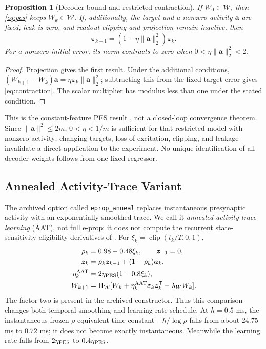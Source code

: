 \documentclass[letterpaper,10pt,conference]{IEEEtran}
\newcommand{\T}{^{\mathsf T}}
\newcommand{\clip}{\operatorname{clip}}
\newtheorem{proposition}{Proposition}
\begin{document}
\begin{proposition}[Decoder bound and restricted contraction]
\label{prop:pes}
If $W_0\in\mathcal W$, then \eqref{eq:pes} keeps $W_k\in\mathcal W$.
If, additionally, the target and a nonzero activity $\bm a$ are fixed,
leak is zero, and readout clipping and projection remain inactive, then
\begin{equation}
 \bm\varepsilon_{k+1}
       =(1-\eta\|\bm a\|_2^2)\bm\varepsilon_k.
 \label{eq:contraction}
\end{equation}
For a nonzero initial error, its norm contracts to zero when
$0<\eta\|\bm a\|_2^2<2$.
\end{proposition}
\begin{proof}
Projection gives the first result. Under the additional conditions,
$(W_{k+1}-W_k)\bm a=\eta\bm\varepsilon_k\|\bm a\|_2^2$;
subtracting this from the fixed target error gives
\eqref{eq:contraction}. The scalar multiplier has modulus less than one
under the stated condition.
\end{proof}
This is the constant-feature PES result \cite{voelker2015pes}, not a
closed-loop convergence theorem. Since $\|\bm a\|^2\le2m$,
$0<\eta<1/m$ is sufficient for that restricted model with nonzero
activity; changing targets, loss of excitation, clipping, and leakage
invalidate a direct application to the experiment. No unique identification
of all decoder weights follows from one fixed regressor.

\subsection{Annealed Activity-Trace Variant}
\label{sec:anneal}
The archived option called \texttt{eprop\_anneal} replaces instantaneous
presynaptic activity with an exponentially smoothed trace. We call it
\emph{annealed activity-trace learning} (AAT), not full e-prop: it does not
compute the recurrent state-sensitivity eligibility derivatives of
\cite{bellec2020eprop}. For $\xi_k=\clip(t_k/T,0,1)$,
\begin{align}
 \rho_k&=0.98-0.48\xi_k,\qquad \bm z_{-1}=0,\\
 \bm z_k&=\rho_k\bm z_{k-1}+(1-\rho_k)\bm a_k,\\
 \eta_k^{\rm AAT}&=2\eta_{\rm PES}(1-0.8\xi_k),\\
 W_{k+1}&=\Pi_{\mathcal W}
 [W_k+\eta_k^{\rm AAT}\bm\varepsilon_k\bm z_k\T-\lambda_WW_k].
 \label{eq:aat}
\end{align}
The factor two is present in the archived constructor. Thus this comparison
changes both temporal smoothing and learning-rate schedule. At
$h=0.5$ ms, the instantaneous frozen-$\rho$ equivalent time constant
$-h/\log\rho$ falls from about $24.75$ ms to $0.72$ ms; it does not become
exactly instantaneous. Meanwhile the learning rate falls from
$2\eta_{\rm PES}$ to $0.4\eta_{\rm PES}$.
\end{document}
